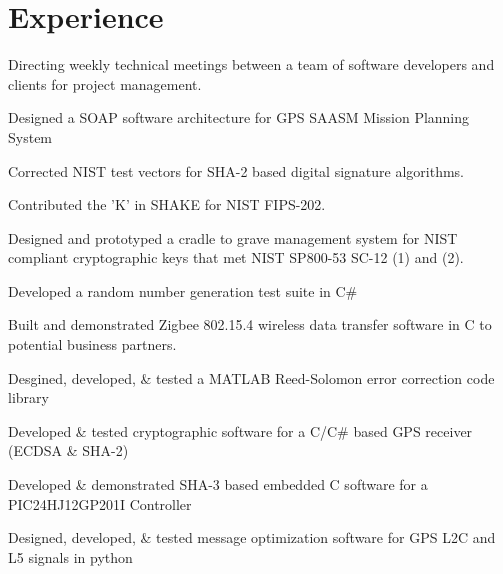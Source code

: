 \documentclass[letterpaper]{deedy-resume} %
\begin{document}
\begin{minipage}[t]{0.66\textwidth} %


\section{Experience}


\vspace{\topsep} %
\begin{tightitemize}
\item Directing weekly technical meetings between a team of software developers and clients for project management.
\item Designed a SOAP software architecture for GPS SAASM Mission Planning System
\item Corrected NIST test vectors for SHA-2 based digital signature algorithms.
\item Contributed the 'K' in SHAKE for NIST FIPS-202.
\item Designed and prototyped a cradle to grave management system for NIST compliant cryptographic keys that met NIST SP800-53 SC-12 (1) and (2).
\item Developed a random number generation test suite in C\#
\item Built and demonstrated Zigbee 802.15.4 wireless data transfer software in C to potential business partners.
\item Desgined, developed, \& tested a MATLAB Reed-Solomon error correction code library
\item Developed \& tested cryptographic software for a C/C\# based GPS receiver (ECDSA \& SHA-2)
\item Developed \& demonstrated SHA-3 based embedded C software for a PIC24HJ12GP201I Controller
\item Designed, developed, \& tested message optimization software for GPS L2C and L5 signals in python


\end{tightitemize}
\end{minipage}
\end{document}
